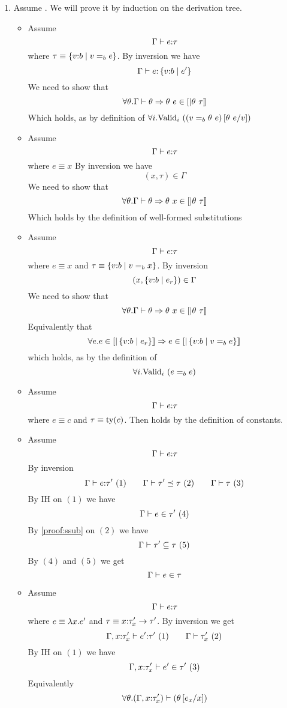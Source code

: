 \begin{enumerate}
\item Assume . 
We will prove it by induction on the derivation tree.

\begin{itemize}
\item \rtexact Assume
$$\hastype{\Gamma}{e}{\tau}$$
where $\tau \equiv \tref{v}{b}{v \eqb{b} e}$.
By inversion we have
$$\hastype{\Gamma}{e}{\tref{v}{b}{e'}}$$
We need to show that 
$$	\forall \theta . \iswellformed{\Gamma}{\theta} \Rightarrow \theta\ e \in \interp{\theta \ \tau}$$
Which holds, as by definition of 
$\generalconditionImplOne{(v \eqb{b} \theta\ e)\sub{v}{\theta\ e}}$
\item\rtvar Assume
$$	\hastype{\Gamma}{e}{\tau}$$
where $e \equiv x$
By inversion we have
$$(x,\tau) \in \Gamma$$
We need to show that 
$$	\forall \theta . \iswellformed{\Gamma}{\theta} \Rightarrow \theta\ x \in \interp{\theta \ \tau}$$
Which holds by the definition of well-formed substitutions
\item\rtvarbase Assume
$$\hastype{\Gamma}{e}{\tau}$$
where $e\equiv x$ and $\tau\equiv\tref{v}{b}{v\eqb{b}x}$.
By inversion
$$(x,\tref{v}{b}{e_r}) \in \Gamma$$ 
We need to show that 
$$	\forall \theta . \iswellformed{\Gamma}{\theta} \Rightarrow \theta\ x \in \interp{\theta \ \tau}$$
Equivalently that 
$$\forall e.
 e\in\interp{\tref{v}{b}{e_r}} \Rightarrow e \in \interp{\tref{v}{b}{v \eqb{b} e}}$$
which holds, as by the definition of 
$$\generalconditionImplOne{e\eqb{b}e}$$
\item\rtconst Assume
$$\hastype{\Gamma}{e}{\tau}$$
where $e \equiv c$ and $\tau\equiv\ty{c}$.
Then  holds by the definition of constants.
\item\rtsub Assume 
$$	\hastype{\Gamma}{e}{\tau}$$
By inversion
$$
	\hastype{\Gamma}{e}{\tau'}\ (1) \qquad
	\issubtype{\Gamma}{\tau'}{\tau}\ (2) \qquad
	\iswellformed{\Gamma}{\tau}\ (3)
$$
By IH on $(1)$ we have
$$	\shastype{\Gamma}{e}{\tau'}\ (4)$$
By \ref{proof:ssub} on $(2)$ we have
$$	\sissubtype{\Gamma}{\tau'}{\tau}\ (5)$$
By $(4)$ and $(5)$ we get
$$	\shastype{\Gamma}{e}{\tau}$$
\item\rtfun Assume
$$	\hastype{\Gamma}{e}{\tau}$$
where $e \equiv \efun{x}{e'}$ and 
$\tau \equiv\tfun{x}{\tau'_x}{\tau'}$.
By inversion we get
$$
	\hastype{\Gamma, x\colon\tau'_x}{e'}{\tau'}\ (1) \qquad
	\iswellformed{\Gamma}{\tau'_x}\ (2)
$$
By IH on $(1)$ we have
$$
	\shastype{\Gamma, x\colon\tau'_x}{e'}{\tau'}\ (3)
$$
Equivalently
$$	
\forall \theta . \iswellformed{(\Gamma,x\colon\tau'_x)}{(\theta\sub{x}{e_x})} 
$$
\end{itemize}
\end{enumerate}
